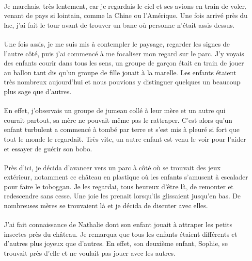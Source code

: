 \paragraph{} Je marchais, très lentement, car je regardais le ciel et ses
avions en train de voler, venant de pays si lointain, comme la Chine ou
l'Amérique. Une fois arrivé près du lac, j'ai fait le tour avant de trouver un
banc où personne n'était assis dessus.

\paragraph{} Une fois assis, je me suis mis à contempler le paysage, regarder
les signes de l'autre côté, puis j'ai commencé à me focaliser mon regard sur le
parc. J'y voyais des enfants courir dans tous les sens, un groupe de garçon
était en train de jouer au ballon tant dis qu'un groupe de fille jouait à la
marelle. Les enfants étaient très nombreux aujourd'hui et nous pouvions y
distinguer quelques un beaucoup plus sage que d'autres.

\paragraph{} En effet, j'observais un groupe de jumeau collé à leur mère et un
autre qui courait partout, sa mère ne pouvait même pas le rattraper. C'est
alors qu'un enfant turbulent a commencé à tombé par terre et s'est mis à pleuré
si fort que tout le monde le regardait. Très vite, un autre enfant est venu le
voir pour l'aider et essayer de guérir son bobo.

\paragraph{} Près d'ici, je décida d'avancer vers un parc à côté où se trouvait
des jeux extérieur, notamment ce château en plastique où les enfants s'amusent
à escalader pour faire le toboggan. Je les regardai, tous heureux d'être là, de
remonter et redescendre sans cesse. Une joie les prenait lorsqu'ils glissaient
jusqu'en bas. De nombreuses mères se trouvaient là et je décida de discuter
avec elles.

\paragraph{} J'ai fait connaissance de Nathalie dont son enfant jouait à
attraper les petits insectes près du château. Je remarqua que tous les enfants
étaient différents et d'autres plus joyeux que d'autres. En effet, son deuxième
enfant, Sophie, se trouvait près d'elle et ne voulait pas jouer avec les
autres.


